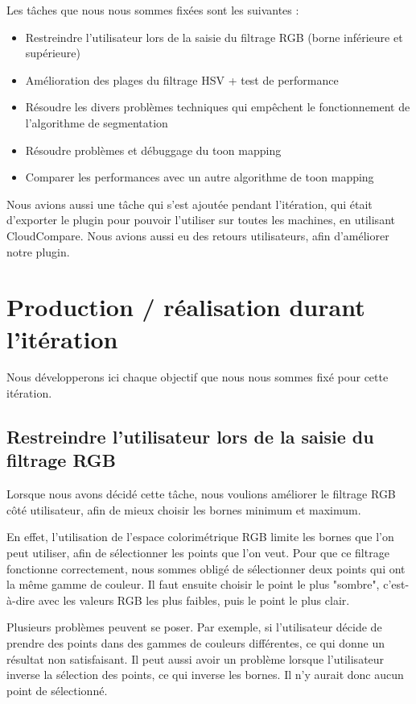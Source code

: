 \documentclass[12pt,titlepage,french]{article}
\begin{document}
Les tâches que nous nous sommes fixées sont les suivantes :

\begin{itemize}
    \item Restreindre l'utilisateur lors de la saisie du filtrage RGB (borne inférieure et supérieure)
    \item Amélioration des plages du filtrage HSV + test de performance
    \item Résoudre les divers problèmes techniques qui empêchent le fonctionnement de l'algorithme de segmentation
    \item Résoudre problèmes et débuggage du toon mapping
    \item Comparer les performances avec un autre algorithme de toon mapping
\end{itemize}

Nous avions aussi une tâche qui s'est ajoutée pendant l'itération, qui était d'exporter le plugin pour pouvoir l'utiliser sur toutes les machines, en utilisant CloudCompare. Nous avions aussi eu des retours utilisateurs, afin d'améliorer notre plugin.

\section{Production / réalisation durant l'itération}

Nous développerons ici chaque objectif que nous nous sommes fixé pour cette itération.

\subsection{Restreindre l'utilisateur lors de la saisie du filtrage RGB}

Lorsque nous avons décidé cette tâche, nous voulions améliorer le filtrage RGB côté utilisateur, afin de mieux choisir les bornes minimum et maximum. \newline

En effet, l'utilisation de l'espace colorimétrique RGB limite les bornes que l'on peut utiliser, afin de sélectionner les points que l'on veut. Pour que ce filtrage fonctionne correctement, nous sommes obligé de sélectionner deux points qui ont la même gamme de couleur. Il faut ensuite choisir le point le plus "sombre", c'est-à-dire avec les valeurs RGB les plus faibles, puis le point le plus clair. \newline

Plusieurs problèmes peuvent se poser. Par exemple, si l'utilisateur décide de prendre des points dans des gammes de couleurs différentes, ce qui donne un résultat non satisfaisant. Il peut aussi avoir un problème lorsque l'utilisateur inverse la sélection des points, ce qui inverse les bornes. Il n'y aurait donc aucun point de sélectionné. \newline
\end{document}
